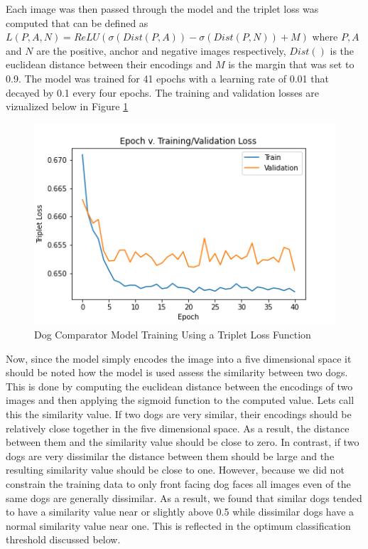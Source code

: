\documentclass{article}
\begin{document}
Each image was then passed through the model and the triplet loss was computed that can be defined as $L(P, A, N) = ReLU(\sigma(Dist(P, A)) - \sigma(Dist(P, N)) + M)$ where $P, A$ and $N$ are the positive, anchor and negative images respectively, $Dist()$ is the euclidean distance between their encodings and $M$ is the margin that was set to 0.9.  The model was trained for 41 epochs with a learning rate of 0.01 that decayed by 0.1 every four epochs.  The training and validation losses are vizualized below in Figure \ref{fig:x epoch_v_map} 

\newpage

\begin{figure}[h]
\centering
	\includegraphics[scale=0.7]{final-report-images/triplet_training.png}
\caption{Dog Comparator Model Training Using a Triplet Loss Function}
\label{fig:x epoch_v_map}
\end{figure}
Now, since the model simply encodes the image into a five dimensional space it should be noted how the model is used assess the similarity between two dogs.  This is done by computing the euclidean distance between the encodings of two images and then applying the sigmoid function to the computed value.  Lets call this the similarity value.  If two dogs are very similar, their encodings should be relatively close together in the five dimensional space.  As a result, the distance between them and the similarity value should be close to zero.  In contrast, if two dogs are very dissimilar the distance between them should be large and the resulting similarity value should be close to one.  However, because we did not constrain the training data to only front facing dog faces all images even of the same dogs are generally dissimilar.  As a result, we found that similar dogs tended to have a similarity value near or slightly above 0.5 while dissimilar dogs have a normal similarity value near one.  This is reflected in the optimum classification threshold discussed below.
\end{document}
